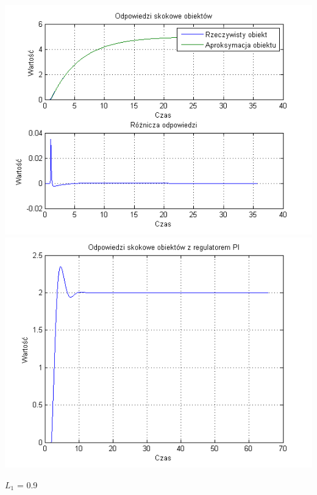 \documentclass[10pt,a4paper]{article}
\begin{document}
\begin{center}
\includegraphics[scale=1]{images/jeden/skrypt_203.png}\\
\includegraphics[scale=1]{images/jeden/skrypt_204.png}\\
\end{center}
\newpage
$L_1$ = 0.9
\end{document}

